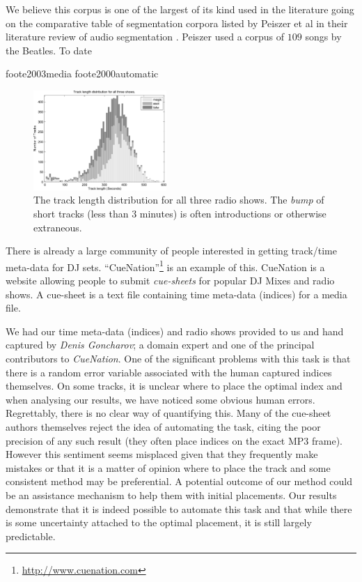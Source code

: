 \documentclass[twocolumn]{article}
\begin{document}
	We believe this corpus is one of the largest of its kind used in the literature going on the comparative table of segmentation corpora listed by Peiszer et al in their literature review of audio segmentation \cite{peiszer2008automatic}. Peiszer used a corpus of $109$ songs by the Beatles. To date
	
	foote2003media foote2000automatic 

	\begin{figure}
		\centering
		\includegraphics[width=0.45\textwidth]{images/tracklength.pdf}
		
		\caption{The track length distribution for all three radio shows. The \textit{bump} of short tracks (less than $3$ minutes) is often introductions or otherwise extraneous.}
		\label{fig:tracklengths}
	\end{figure} 
	
	There is already a large community of people interested in getting track/time meta-data for DJ sets. ``CueNation''\footnote{\url{http://www.cuenation.com}} is an example of this. CueNation is a website allowing people to submit \textit{cue-sheets} for popular DJ Mixes and radio shows. A cue-sheet is a text file containing time meta-data (indices) for a media file.
	
	We had our time meta-data (indices) and radio shows provided to us and hand captured by \textit{Denis Goncharov}; a domain expert and one of the principal contributors to \textit{CueNation}. One of the significant problems with this task is that there is a random error variable associated with the human captured indices themselves. On some tracks, it is unclear where to place the optimal index and when analysing our results, we have noticed some obvious human errors. Regrettably, there is no clear way of quantifying this. Many of the cue-sheet authors themselves reject the idea of automating the task, citing the poor precision of any such result (they often place indices on the exact MP3 frame). However this sentiment seems misplaced given that they frequently make mistakes or that it is a matter of opinion where to place the track and some consistent method may be preferential. A potential outcome of our method could be an assistance mechanism to help them with initial placements. Our results demonstrate that it is indeed possible to automate this task and that while there is some uncertainty attached to the optimal placement, it is still largely predictable.
	
\end{document}
